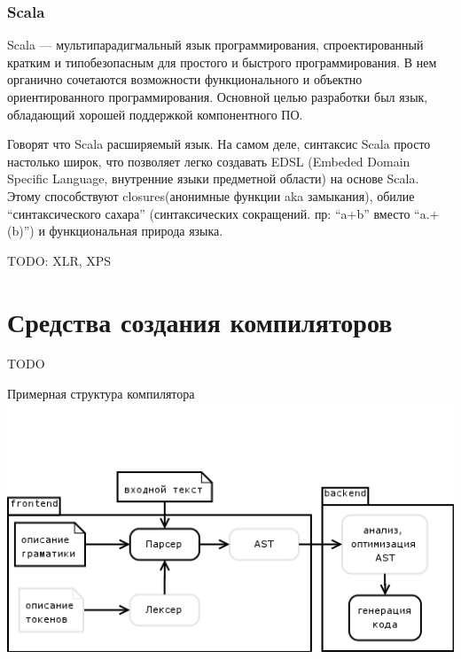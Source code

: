 \documentclass[a4paper,12pt]{article}
\begin{document}
\subsubsection{Scala}
Scala — мультипарадигмальный язык программирования, спроектированный кратким и
типобезопасным для простого и быстрого программирования. В нем органично
сочетаются возможности функционального и объектно ориентированного
программирования. Основной целью разработки был язык, обладающий хорошей
поддержкой компонентного ПО.

Говорят что Scala расширяемый язык. На самом деле, синтаксис Scala просто
настолько широк, что позволяет легко создавать EDSL (Embeded Domain Specific
Language, внутренние языки предметной области) на основе Scala. Этому
способствуют closures(анонимные функции aka замыкания), обилие
``синтаксического сахара'' (синтаксических сокращений. пр: ``a+b'' вместо
``a.+(b)'') и функциональная природа языка.

TODO: XLR, XPS

\section{Средства создания компиляторов}

TODO
\begin{center}
 Примерная структура компилятора
 \includegraphics[scale=0.6]{img/compiler.png}
\end{center}
\end{document}
